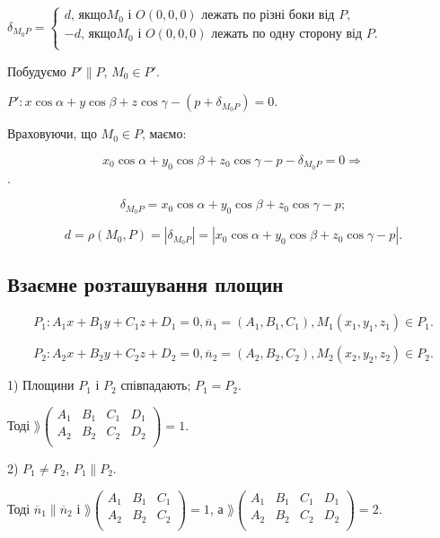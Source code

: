 $\delta_{M_0P} = \left\{\begin{matrix}
	d \text{, якщо} M_0 \text{ і } O(0,0,0)\text{ лежать по різні боки від } P, \\
	-d \text{, якщо} M_0 \text{ і } O(0,0,0)\text{ лежать по одну сторону від } P. \\
\end{matrix} \right.$



Побудуємо $P' \parallel P$, $M_0 \in  P'$.

$P': x \cos \alpha + y \cos \beta + z \cos \gamma - (p + \delta_{M_0P}) = 0$.

Враховуючи, що $M_0 \in P$, маємо:

$$x_0 \cos \alpha + y_0 \cos \beta + z_0 \cos \gamma - p - \delta_{M_0P} = 0 \Rightarrow$$.

$$\delta_{M_0P} = x_0 \cos \alpha + y_0 \cos \beta + z_0 \cos \gamma - p;$$

$$d = \rho(M_0,P) = |\delta_{M_0P}| = |x_0 \cos \alpha + y_0 \cos \beta + z_0 \cos \gamma - p|.$$



\subsection{Взаємне розташування площин}

$$P_1: A_1 x + B_1 y + C_1 z + D_1 = 0, \overline{n}_1 = (A_1,B_1,C_1), M_1(x_1,y_1,z_1)\in P_1.$$

$$P_2: A_2 x + B_2 y + C_2 z + D_2 = 0, \overline{n}_2 = (A_2,B_2,C_2), M_2(x_2,y_2,z_2)\in P_2.$$

1) Площини $P_1$ і $P_2$ співпадають; $P_1 = P_2$.

Тоді $\rang \begin{pmatrix}
	A_1 & B_1 & C_1 & D_1 \\
	A_2 & B_2 & C_2 & D_2 \\
\end{pmatrix} = 1.$

2) $P_1 \neq P_2$, $P_1 \parallel P_2$.

Тоді $\overline{n}_1 \parallel \overline{n}_2$ і $\rang \begin{pmatrix}
	A_1 & B_1 & C_1 \\
	A_2 & B_2 & C_2 \\
\end{pmatrix} = 1$, а $\rang \begin{pmatrix}
	A_1 & B_1 & C_1 & D_1 \\
	A_2 & B_2 & C_2 & D_2 \\
\end{pmatrix} = 2$.

